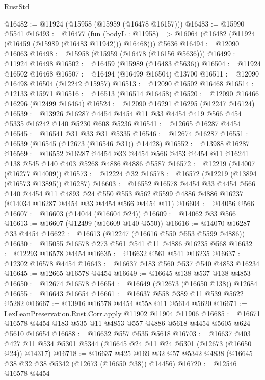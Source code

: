 \begin{lexlean}{RustStd}
\begin{coremodule}
{\begin{coremodule}
{{{{{{{{{{{{{{{{{{{{{{{{{{{{{{{{{{{{{{{{{{{{{{{{{{{{{{{{{{{{{{{{{{{{{{{{{{{{{{{{@16482 := @11924 (@15958 (@15959 (@16478 @16157)))
@16483 := @15990 @5541
@16493 := @16477
    (fun (bodyL : @11958) => @16064 (@16482 (@11924 (@16459 (@15989 (@16483 @11942))) @16468)))
    @5636
@16494 := @12090 @16063
@16498 := @15958 (@15959 (@16478 (@16156 @5636)))
@16499 := @11924 @16498
@16502 := @16459 (@15989 (@16483 @5636))
@16504 := @11924 @16502 @16468
@16507 := @16494 (@16499 @16504) @13700
@16511 := @12090 @16498 @16504 (@12242 @15957)
@16513 := @12090 @16502 @16468
@16514 := @12133 @15971
@16516 := @16513 (@16514 @16458)
@16520 := @12090 @16466 @16296 (@12499 @16464)
@16524 := @12090 @16291 @16295 (@12247 @16124)
@16539 := @13926 @16287 @4454 @4454 @11 @33 @4454 @419 @566 @454 @5335 @16242 @140 @5230 @608 @5236
@16541 := @12665 @16287 @4454
@16545 := @16541 @31 @33 @31 @5335
@16546 := @12674 @16287
@16551 := @16539 (@16545 (@12673 (@16546 @31)) @14428)
@16552 := @13988 @16287
@16569 := @16552
    @16287
    @4454
    @33
    @4454
    @566
    @453
    @4454
    @11
    @16241
    @138
    @545
    @140
    @403
    @5268
    @4886
    @4886
    @5587
@16572 := @12219 (@14007 (@16277 @14009))
@16573 := @12224 @32
@16578 := @16572 (@12219 (@13894 (@16573 @13895)) @16287)
@16603 := @16552
    @16578
    @4454
    @33
    @4454
    @566
    @140
    @4454
    @11
    @4893
    @24
    @550
    @553
    @562
    @5599
    @4886
    @4886
    @16237
    (@14034 @16287 @4454 @33 @4454 @566 @4454 @11)
@16604 := @14056 @566
@16607 := @16603 (@14044 (@16604 @24))
@16609 := @14062 @33 @566
@16613 := @16607 (@12499 (@16609 @140 @550))
@16616 := @14070 @16287 @33 @4454
@16622 := @16613 (@12247 (@16616 @550 @553 @5599 @4886))
@16630 := @15055 @16578 @273 @561 @541 @11 @4886 @16235 @568
@16632 := @12293 @16578 @4454
@16635 := @16632 @561 @541 @16235
@16637 := @12302 @16578 @4454
@16643 := @16637 @183 @560 @537 @540 @4853 @16234
@16645 := @12665 @16578 @4454
@16649 := @16645 @138 @537 @138 @4853
@16650 := @12674 @16578
@16654 := @16649 (@12673 (@16650 @138)) @12684
@16655 := @16643 @16654
@16661 := @16637 @558 @389 @11 @539 @5622 @5282
@16667 := @13916 @16578 @4454 @558 @11 @5614 @5620
@16671 := LexLeanPreservation.Rust.Corr.apply @11902 @11904 @11906
@16685 := @16671 @16578 @4454 @183 @535 @11 @4853 @557 @4886 @5618 @4454 @5605 @624 @5610 @16654
@16688 := @16632 @557 @535 @5618
@16703 := @16637
    @403
    @427
    @11
    @534
    @5301
    @5344
    (@16645 @24 @11 @24 @5301 (@12673 (@16650 @24)) @14317)
@16718 := @16637
    @425
    @169
    @32
    @57
    @5342
    @4838
    (@16645 @38 @32 @38 @5342 (@12673 (@16650 @38)) @14456)
@16720 := @12546 @16578 @4454
}}}}}}}}}}}}}}}}}}}}}}}}}}}}}}}}}}}}}}}}}}}}}}}}}}}}}}}}}}}}}}}}}}}}}}}}}}}}}}}}
\end{coremodule}}
\end{coremodule}
\end{lexlean}
